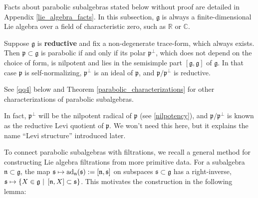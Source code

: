 \documentclass[leqno,12pt]{amsart} %
\begin{document}
Facts about parabolic subalgebras stated below without proof are detailed in Appendix
\ref{lie_algebra_facts}. In this subsection, ${\mathfrak g} $ is always a
finite-dimensional Lie algebra over a field of characteristic zero, such as ${\mathbb R} $
or ${\mathbb C} $.

\begin{theorem} Suppose ${\mathfrak g} $ is
  {\bfseries reductive} and fix a non-degenerate trace-form, which always exists. Then
  ${\mathfrak p} \subset {\mathfrak g} $ is parabolic if and only if its polar
  ${\mathfrak p}^\perp$, which does not depend on the choice of form, is nilpotent and
  lies in the semisimple part $[{\mathfrak g}, {\mathfrak g}]$ of ${\mathfrak g}$. In that
  case ${\mathfrak p} $ is self-normalizing, ${\mathfrak p}^\perp $ is an ideal of
  ${\mathfrak p} $, and ${\mathfrak p}/{\mathfrak p}^\perp $ is reductive.
\end{theorem}
\noindent%
See \eqref{qq4} below and Theorem \ref{parabolic_characterizations} for other
characterizations of parabolic subalgebras.
\begin{remark}
  In fact, ${\mathfrak p}^\perp$ will be the nilpotent radical of
  ${\mathfrak p}$ (see \ref{nilpotency}), and ${\mathfrak p}/{\mathfrak p}^\perp$ is
  known as the {\df reductive Levi quotient} of ${\mathfrak p}$. We won't need this here,
  but it explains the name ``Levi structure'' introduced later.
\end{remark}

To connect parabolic subalgebras with filtrations, we recall a general method for
constructing Lie algebra filtrations from more primitive data. For a subalgebra
${\mathfrak n} \subset {\mathfrak g} $, the map
${\mathfrak s} \mapsto \operatorname{ad}_{\mathfrak n}({\mathfrak s}):=[{\mathfrak n}, {\mathfrak
  s}]$ on subspaces ${\mathfrak s} \subset {\mathfrak g} $ has a right-inverse,
${\mathfrak s} \mapsto \{X \in {\mathfrak g} \,\left\vert\right.\, [{\mathfrak n}, X] \subset
{\mathfrak s}\}$. This motivates the construction in the following lemma:
\end{document}
